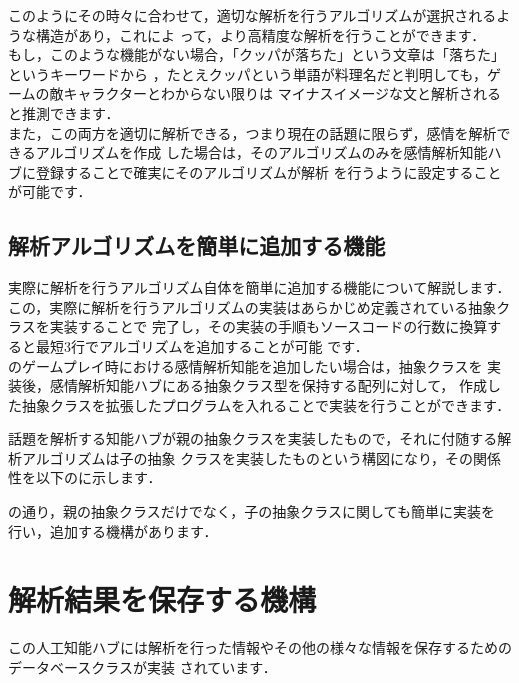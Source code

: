 このようにその時々に合わせて，適切な解析を行うアルゴリズムが選択されるような構造があり，これによ
って，より高精度な解析を行うことができます．
\\
もし，このような機能がない場合，「クッパが落ちた」という文章は「落ちた」というキーワードから
，たとえクッパという単語が料理名だと判明しても，ゲームの敵キャラクターとわからない限りは
マイナスイメージな文と解析されると推測できます．
\\

また，この両方を適切に解析できる，つまり現在の話題に限らず，感情を解析できるアルゴリズムを作成
した場合は，そのアルゴリズムのみを感情解析知能ハブに登録することで確実にそのアルゴリズムが解析
を行うように設定することが可能です．

\subsection{解析アルゴリズムを簡単に追加する機能}
実際に解析を行うアルゴリズム自体を簡単に追加する機能について解説します．\\
この，実際に解析を行うアルゴリズムの実装はあらかじめ定義されている抽象クラスを実装することで
完了し，その実装の手順もソースコードの行数に換算すると最短3行でアルゴリズムを追加することが可能
です．\\

のゲームプレイ時における感情解析知能を追加したい場合は，抽象クラスを
実装後，感情解析知能ハブにある抽象クラス型を保持する配列に対して，
作成した抽象クラスを拡張したプログラムを入れることで実装を行うことができます．

話題を解析する知能ハブが親の抽象クラスを実装したもので，それに付随する解析アルゴリズムは子の抽象
クラスを実装したものという構図になり，その関係性を以下のに示します．


の通り，親の抽象クラスだけでなく，子の抽象クラスに関しても簡単に実装を
行い，追加する機構があります．

\newpage

\section{解析結果を保存する機構}
この人工知能ハブには解析を行った情報やその他の様々な情報を保存するためのデータベースクラスが実装
されています．\\

